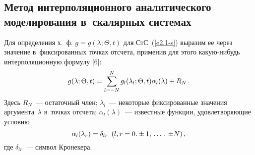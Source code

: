 \begin{multicols}{2}
\section{Метод интерполяционного аналитического моделирования в~скалярных системах}

Для определения х.~ф. $g=g(\lambda;\Theta, t)$ для СтС~(\ref{e2.1-s}) 
выразим ее через значение в~фиксированных точках отсчета, применив для 
этого какую-нибудь интерполяционную формулу [6]:
        \begin{equation}
    g(\lambda; \Theta, t) = \sum\limits_{l=-N}^N g_l 
    (\lambda_l;\Theta, t) \alpha_l (\lambda)+ 
    R_N\,.
    \label{e4.1-s}
    \end{equation}
Здесь $R_N$~--- остаточный член;  $\lambda_l$~--- 
некоторые фиксированные значения аргумента~$\lambda$ в~точках отсчета;
$\alpha_l(\lambda)$~--- известные функции, удовлетворяющие условию
\begin{equation*}
\alpha_l (\lambda_r) =\delta_{lr}\enskip (l,r=0. \pm 1,\,\ldots\,,\, \pm N)\,,
    \end{equation*}
где $\delta_{lr}$~--- символ Кронекера.


\end{multicols}
